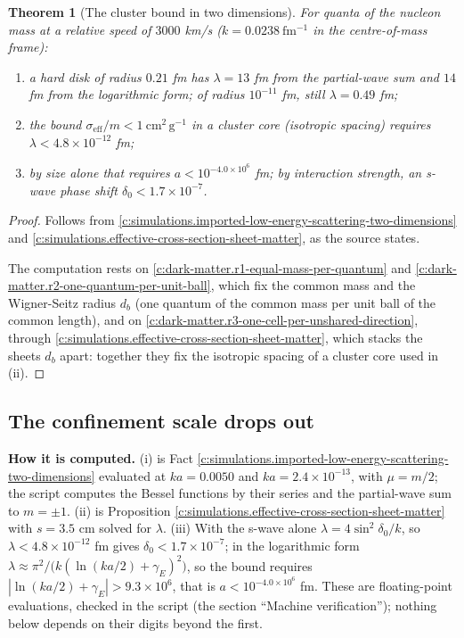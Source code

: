 \documentclass[11pt]{article}
\newtheorem{theorem}{Theorem}[section]
\theoremstyle{definition}
\theoremstyle{plain}
\newcommand{\changedmark}[2]{\marginpar{\raggedright\scriptsize\color{#1}#2}}
\providecommand{\cmg}{}\renewcommand{\cmg}{\mathrm{cm^{2}\,g^{-1}}}
\begin{document}
\begin{theorem}[The cluster bound in two dimensions]\label{c:simulations.cluster-bound-two-dimensions}
\changedmark{BurntOrange}{changed since the deposit}
For quanta of the nucleon mass at a relative speed of $3000$ km/s ($k = 0.0238\ \mathrm{fm^{-1}}$ in the centre-of-mass frame):
\begin{enumerate}
\item[(i)] a hard disk of radius $0.21$ fm has $\lambda = 13$ fm from the partial-wave sum and $14$ fm from the logarithmic form; of radius $10^{-11}$ fm, still $\lambda = 0.49$ fm;
\item[(ii)] the bound $\sigma_{\mathrm{eff}}/m < 1\ \cmg$ in a cluster core (isotropic spacing) requires $\lambda < 4.8 \times 10^{-12}$ fm;
\item[(iii)] by size alone that requires $a < 10^{-4.0 \times 10^{6}}$ fm; by interaction strength, an s-wave phase shift $\delta_{0} < 1.7 \times 10^{-7}$.
\end{enumerate}
\end{theorem}
\begin{proof}
Follows from \ref{c:simulations.imported-low-energy-scattering-two-dimensions} and \ref{c:simulations.effective-cross-section-sheet-matter}, as the source states.

The computation rests on \ref{c:dark-matter.r1-equal-mass-per-quantum} and \ref{c:dark-matter.r2-one-quantum-per-unit-ball}, which fix the common mass and the Wigner-Seitz radius $d_{b}$ (one quantum of the common mass per unit ball of the common length), and on \ref{c:dark-matter.r3-one-cell-per-unshared-direction}, through \ref{c:simulations.effective-cross-section-sheet-matter}, which stacks the sheets $d_{b}$ apart: together they fix the isotropic spacing of a cluster core used in (ii).

\end{proof}

\subsection*{The confinement scale drops out}
\label{c:note.simulations.setting-confinement-scale-drops-out}
\textbf{How it is computed.} (i) is Fact \ref{c:simulations.imported-low-energy-scattering-two-dimensions} evaluated at $ka = 0.0050$ and $ka = 2.4 \times 10^{-13}$, with $\mu = m/2$; the script computes the Bessel functions by their series and the partial-wave sum to $m = \pm 1$. (ii) is Proposition \ref{c:simulations.effective-cross-section-sheet-matter} with $s = 3.5$ cm solved for $\lambda$. (iii) With the s-wave alone $\lambda = 4\sin^{2}\delta_{0}/k$, so $\lambda < 4.8 \times 10^{-12}$ fm gives $\delta_{0} < 1.7 \times 10^{-7}$; in the logarithmic form $\lambda \approx \pi^{2}/\bigl(k(\ln(ka/2) + \gamma_{E})^{2}\bigr)$, so the bound requires $|\ln(ka/2) + \gamma_{E}| > 9.3 \times 10^{6}$, that is $a < 10^{-4.0 \times 10^{6}}$ fm. These are floating-point evaluations, checked in the script (the section ``Machine verification''); nothing below depends on their digits beyond the first.
\end{document}
